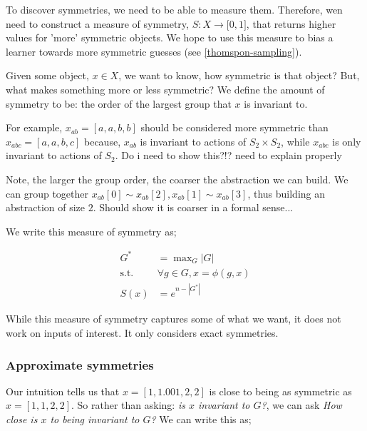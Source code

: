 To discover symmetries, we need to be able to measure them.
Therefore, wen need to construct a measure of symmetry, $S: X \to \mathbb [0, 1]$, that returns higher values for 'more' symmetric objects.
We hope to use this measure to bias a learner towards more symmetric guesses (see \ref{thomspon-sampling}).

Given some object, $x \in X$, we want to know, how symmetric is that object?
But, what makes something more or less symmetric?
We define the amount of symmetry to be: the order of the largest group that $x$ is invariant to.

For example, $x_{ab} = [a,a,b,b]$ should be considered more symmetric than $x_{abc} = [a,a,b,c]$ because,
$x_{ab}$ is invariant to actions of $S_2 \times S_2$, while $x_{abc}$ is only invariant to actions of $S_2$.
{\color{red}Do i need to show this?!? need to explain properly}

Note, the larger the group order, the coarser the abstraction we can build. We can group together $x_{ab}[0] \sim x_{ab}[2], x_{ab}[1] \sim x_{ab}[3]$, thus building an abstraction of size $2$.
{\color{red}Should show it is coarser in a formal sense...}


We write this measure of symmetry as;

\begin{align*}
G^{* } &= \mathop{\text{max}}_G |G| \tag{pick the largest group}\\
\text{s.t.} \;\; &\forall g\in G, x = \phi(g, x) \tag{that $x$ is invariant to} \\
S(x) &= e^{n-|G^{* }|}
\end{align*}

While this measure of symmetry captures some of what we want, it does not work on inputs of interest.
It only considers exact symmetries.

\subsubsection{Approximate symmetries}

Our intuition tells us that $x = [1,1.001,2,2]$ is close to being as symmetric as
$x = [1,1,2,2]$. So rather than asking: \textit{is $x$ invariant to $G$?}, we can ask
\textit{How close is $x$ to being invariant to $G$?} We can write this as;

